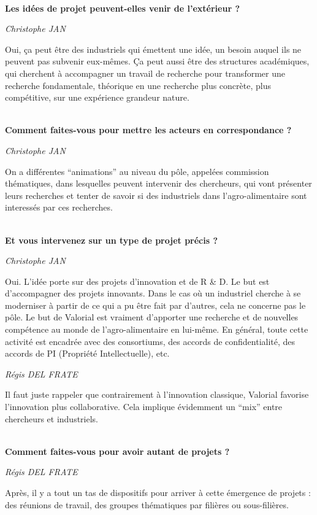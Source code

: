 \documentclass[a4paper,12pt]{report}
\begin{document}
	\textbf{\\Les idées de projet peuvent-elles venir de l’extérieur ?}
    
	\emph{Christophe JAN}

	Oui, ça peut être des industriels qui émettent une idée, un besoin auquel ils ne peuvent pas subvenir eux-mêmes. Ça peut aussi être des structures académiques, qui cherchent à accompagner un travail de recherche pour transformer une recherche fondamentale, théorique en une recherche plus concrète, plus compétitive, sur une expérience grandeur nature.

	\textbf{\\Comment faites-vous pour mettre les acteurs en correspondance ?}

	\emph{Christophe JAN}
    
    On a différentes “animations” au niveau du pôle, appelées commission thématiques, dans lesquelles peuvent intervenir des chercheurs, qui vont présenter leurs recherches et tenter de savoir si des industriels dans l’agro-alimentaire sont interessés par ces recherches.

	\textbf{\\Et vous intervenez sur un type de projet précis ?}

	\emph{Christophe JAN }
  
    Oui. L’idée porte sur des projets d’innovation et de R \& D. Le but est d’accompagner des projets innovants. Dans le cas où un industriel cherche à se moderniser à partir de ce qui a pu être fait par d’autres, cela ne concerne pas le pôle. Le but de Valorial est vraiment d’apporter une recherche et de nouvelles compétence au monde de l’agro-alimentaire en lui-même. En général, toute cette activité est encadrée avec des consortiums, des accords de confidentialité, des accords de PI (Propriété Intellectuelle), etc. 

	\emph{Régis DEL FRATE}
 
    Il faut juste rappeler que contrairement à l’innovation classique, Valorial favorise l’innovation plus collaborative. Cela implique évidemment un “mix” entre chercheurs et industriels. 

	\textbf{\\Comment faites-vous pour avoir autant de projets ?}

	\emph{Régis DEL FRATE}
	
    Après, il y a tout un tas de dispositifs pour arriver à cette émergence de projets : des réunions de travail, des groupes thématiques par filières ou sous-filières.
\end{document}
